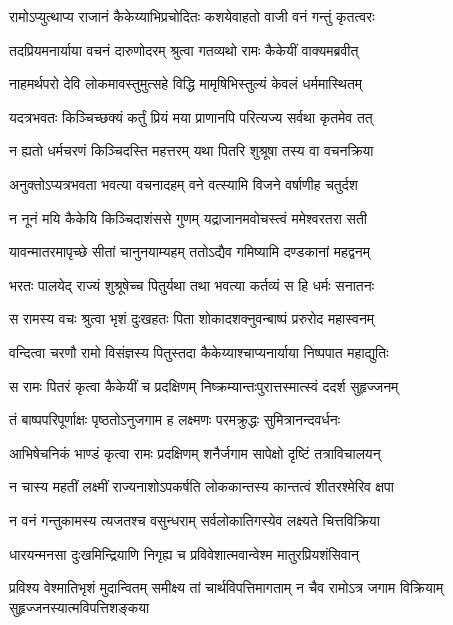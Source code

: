 \twolineshloka
{रामोऽप्युत्थाप्य राजानं कैकेय्याभिप्रचोदितः}
{कशयेवाहतो वाजी वनं गन्तुं कृतत्वरः} %

\twolineshloka
{तदप्रियमनार्याया वचनं दारुणोदरम्}
{श्रुत्वा गतव्यथो रामः कैकेयीं वाक्यमब्रवीत्} %

\twolineshloka
{नाहमर्थपरो देवि लोकमावस्तुमुत्सहे}
{विद्धि मामृषिभिस्तुल्यं केवलं धर्ममास्थितम्} %

\twolineshloka
{यदत्रभवतः किञ्चिच्छक्यं कर्तुं प्रियं मया}
{प्राणानपि परित्यज्य सर्वथा कृतमेव तत्} %

\twolineshloka
{न ह्यतो धर्मचरणं किञ्चिदस्ति महत्तरम्}
{यथा पितरि शुश्रूषा तस्य वा वचनक्रिया} %

\twolineshloka
{अनुक्तोऽप्यत्रभवता भवत्या वचनादहम्}
{वने वत्स्यामि विजने वर्षाणीह चतुर्दश} %

\twolineshloka
{न नूनं मयि कैकेयि किञ्चिदाशंससे गुणम्}
{यद्राजानमवोचस्त्वं ममेश्वरतरा सती} %

\twolineshloka
{यावन्मातरमापृच्छे सीतां चानुनयाम्यहम्}
{ततोऽद्यैव गमिष्यामि दण्डकानां महद्वनम्} %

\twolineshloka
{भरतः पालयेद् राज्यं शुश्रूषेच्च पितुर्यथा}
{तथा भवत्या कर्तव्यं स हि धर्मः सनातनः} %

\twolineshloka
{स रामस्य वचः श्रुत्वा भृशं दुःखहतः पिता}
{शोकादशक्नुवन्बाष्पं प्ररुरोद महास्वनम्} %

\twolineshloka
{वन्दित्वा चरणौ रामो विसंज्ञस्य पितुस्तदा}
{कैकेय्याश्चाप्यनार्याया निष्पपात महाद्युतिः} %

\twolineshloka
{स रामः पितरं कृत्वा कैकेयीं च प्रदक्षिणम्}
{निष्क्रम्यान्तःपुरात्तस्मात्स्वं ददर्श सुहृज्जनम्} %

\twolineshloka
{तं बाष्पपरिपूर्णाक्षः पृष्ठतोऽनुजगाम ह}
{लक्ष्मणः परमक्रुद्धः सुमित्रानन्दवर्धनः} %

\twolineshloka
{आभिषेचनिकं भाण्डं कृत्वा रामः प्रदक्षिणम्}
{शनैर्जगाम सापेक्षो दृष्टिं तत्राविचालयन्} %

\twolineshloka
{न चास्य महतीं लक्ष्मीं राज्यनाशोऽपकर्षति}
{लोककान्तस्य कान्तत्वं शीतरश्मेरिव क्षपा} %

\twolineshloka
{न वनं गन्तुकामस्य त्यजतश्च वसुन्धराम्}
{सर्वलोकातिगस्येव लक्ष्यते चित्तविक्रिया} %

\twolineshloka
{धारयन्मनसा दुःखमिन्द्रियाणि निगृह्य च}
{प्रविवेशात्मवान्वेश्म मातुरप्रियशंसिवान्} %

\fourlineindentedshloka
{प्रविश्य वेश्मातिभृशं मुदान्वितम्}
{समीक्ष्य तां चार्थविपत्तिमागताम्}
{न चैव रामोऽत्र जगाम विक्रियाम्}
{सुहृज्जनस्यात्मविपत्तिशङ्कया} %


